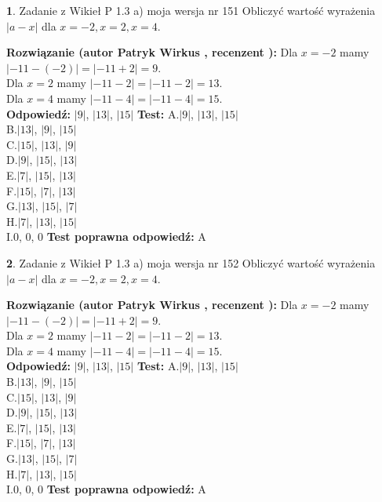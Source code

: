 \documentclass[12pt, a4paper]{article}
\theoremstyle{definition} %
\newtheorem{zad}{}
\newcommand{\zadStart}[1]{\begin{zad}#1\newline}
\newcommand{\zadStop}{\end{zad}}
\newcommand{\rozwStart}[2]{\noindent \textbf{Rozwiązanie (autor #1 , recenzent #2): }\newline}
\newcommand{\rozwStop}{\newline}
\newcommand{\odpStart}{\noindent \textbf{Odpowiedź:}\newline}
\newcommand{\odpStop}{\newline}
\newcommand{\testStart}{\noindent \textbf{Test:}\newline}
\newcommand{\testStop}{\newline}
\newcommand{\kluczStart}{\noindent \textbf{Test poprawna odpowiedź:}\newline}
\newcommand{\kluczStop}{\newline}
\begin{document}
\zadStart{Zadanie z Wikieł P 1.3 a) moja wersja nr 151}
Obliczyć wartość wyrażenia $|a - x|$ dla $x=-2,x=2,x=4$.
\zadStop
\rozwStart{Patryk Wirkus}{}
Dla $x = -2$ mamy $|-11 - (-2)| = |-11 + 2| = 9$.\\
Dla $x = 2$ mamy $|-11 - 2| = |-11 - 2| = 13$.\\
Dla $x = 4$ mamy $|-11 - 4| = |-11 - 4| = 15$.\\
\rozwStop
\odpStart
$|9|$, $|13|$, $|15|$
\odpStop
\testStart
A.$|9|$, $|13|$, $|15|$\\
B.$|13|$, $|9|$, $|15|$\\
C.$|15|$, $|13|$, $|9|$\\
D.$|9|$, $|15|$, $|13|$\\
E.$|7|$, $|15|$, $|13|$\\
F.$|15|$, $|7|$, $|13|$\\
G.$|13|$, $|15|$, $|7|$\\
H.$|7|$, $|13|$, $|15|$\\
I.$0$, $0$, $0$
\testStop
\kluczStart
A
\kluczStop



\zadStart{Zadanie z Wikieł P 1.3 a) moja wersja nr 152}
Obliczyć wartość wyrażenia $|a - x|$ dla $x=-2,x=2,x=4$.
\zadStop
\rozwStart{Patryk Wirkus}{}
Dla $x = -2$ mamy $|-11 - (-2)| = |-11 + 2| = 9$.\\
Dla $x = 2$ mamy $|-11 - 2| = |-11 - 2| = 13$.\\
Dla $x = 4$ mamy $|-11 - 4| = |-11 - 4| = 15$.\\
\rozwStop
\odpStart
$|9|$, $|13|$, $|15|$
\odpStop
\testStart
A.$|9|$, $|13|$, $|15|$\\
B.$|13|$, $|9|$, $|15|$\\
C.$|15|$, $|13|$, $|9|$\\
D.$|9|$, $|15|$, $|13|$\\
E.$|7|$, $|15|$, $|13|$\\
F.$|15|$, $|7|$, $|13|$\\
G.$|13|$, $|15|$, $|7|$\\
H.$|7|$, $|13|$, $|15|$\\
I.$0$, $0$, $0$
\testStop
\kluczStart
A
\kluczStop
\end{document}
